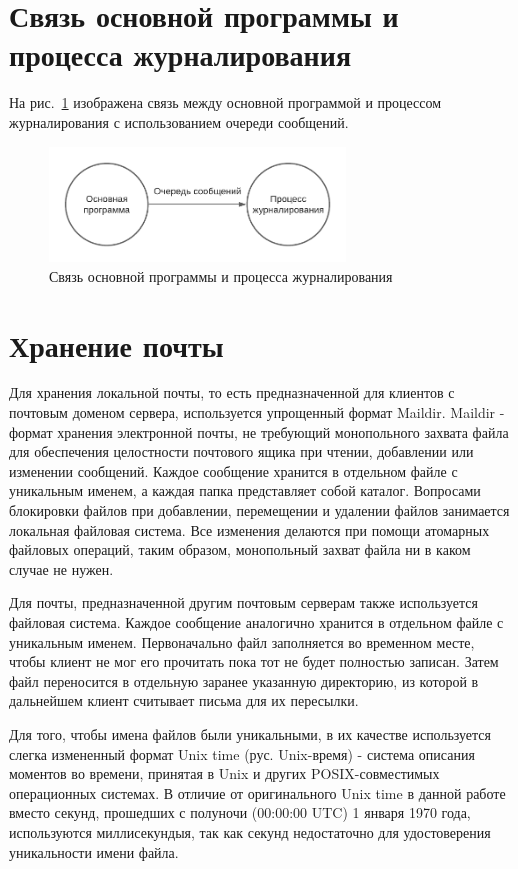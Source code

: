 \documentclass[a4paper,12pt]{report}
\begin{document}
\section{Связь основной программы и процесса журналирования}

На рис.~\ref{fig:ipc} изображена связь между основной программой и процессом журналирования с использованием очереди сообщений.

\begin{figure}[h]
    \centering
    \includegraphics[width=0.7\textwidth]{pics/ipc.pdf}
    \caption{Связь основной программы и процесса журналирования}
    \label{fig:ipc}
\end{figure}


\section{Хранение почты}

Для хранения локальной почты, то есть предназначенной для клиентов с почтовым доменом сервера, используется упрощенный формат Maildir. Maildir - формат хранения электронной почты, не требующий монопольного захвата файла для обеспечения целостности почтового ящика при чтении, добавлении или изменении сообщений. Каждое сообщение хранится в отдельном файле с уникальным именем, а каждая папка представляет собой каталог. Вопросами блокировки файлов при добавлении, перемещении и удалении файлов занимается локальная файловая система. Все изменения делаются при помощи атомарных файловых операций, таким образом, монопольный захват файла ни в каком случае не нужен.

Для почты, предназначенной другим почтовым серверам также используется файловая система. Каждое сообщение аналогично хранится в отдельном файле с уникальным именем. Первоначально файл заполняется во временном месте, чтобы клиент не мог его прочитать пока тот не будет полностью записан. Затем файл переносится в отдельную заранее указанную директорию, из которой в дальнейшем клиент считывает письма для их пересылки. 

Для того, чтобы имена файлов были уникальными, в их качестве используется слегка измененный формат Unix time (рус. Unix-время) - система описания моментов во времени, принятая в Unix и других POSIX-совместимых операционных системах. В отличие от оригинального Unix time в данной работе вместо секунд, прошедших с полуночи (00:00:00 UTC) 1 января 1970 года, используются миллисекундыя, так как секунд недостаточно для удостоверения уникальности имени файла.
\end{document}
